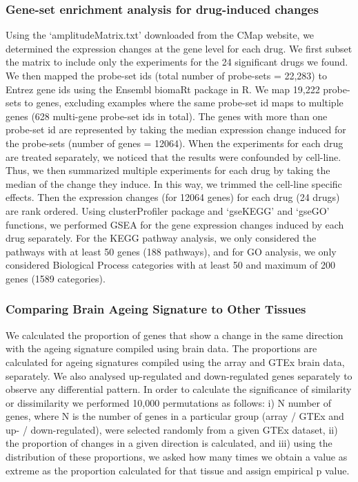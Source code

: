 \documentclass[12pt,twoside]{unicam}
\begin{document}
\hypertarget{drugHitGO}{%
\subsubsection{Gene-set enrichment analysis for drug-induced changes}\label{drugHitGO}}

Using the `amplitudeMatrix.txt' downloaded from the CMap website, we determined the expression changes at the gene level for each drug. We first subset the matrix to include only the experiments for the 24 significant drugs we found. We then mapped the probe-set ids (total number of probe-sets = 22,283) to Entrez gene ids using the Ensembl biomaRt package in R. We map 19,222 probe-sets to genes, excluding examples where the same probe-set id maps to multiple genes (628 multi-gene probe-set ids in total). The genes with more than one probe-set id are represented by taking the median expression change induced for the probe-sets (number of genes = 12064). When the experiments for each drug are treated separately, we noticed that the results were confounded by cell-line. Thus, we then summarized multiple experiments for each drug by taking the median of the change they induce. In this way, we trimmed the cell-line specific effects. Then the expression changes (for 12064 genes) for each drug (24 drugs) are rank ordered. Using clusterProfiler package and `gseKEGG' and `gseGO' functions, we performed GSEA for the gene expression changes induced by each drug separately. For the KEGG pathway analysis, we only considered the pathways with at least 50 genes (188 pathways), and for GO analysis, we only considered Biological Process categories with at least 50 and maximum of 200 genes (1589 categories).

\hypertarget{comparing-brain-ageing-signature-to-other-tissues}{%
\subsubsection{Comparing Brain Ageing Signature to Other Tissues}\label{comparing-brain-ageing-signature-to-other-tissues}}

We calculated the proportion of genes that show a change in the same direction with the ageing signature compiled using brain data. The proportions are calculated for ageing signatures compiled using the array and GTEx brain data, separately. We also analysed up-regulated and down-regulated genes separately to observe any differential pattern. In order to calculate the significance of similarity or dissimilarity we performed 10,000 permutations as follows: i) N number of genes, where N is the number of genes in a particular group (array / GTEx and up- / down-regulated), were selected randomly from a given GTEx dataset, ii) the proportion of changes in a given direction is calculated, and iii) using the distribution of these proportions, we asked how many times we obtain a value as extreme as the proportion calculated for that tissue and assign empirical p value.
\end{document}
